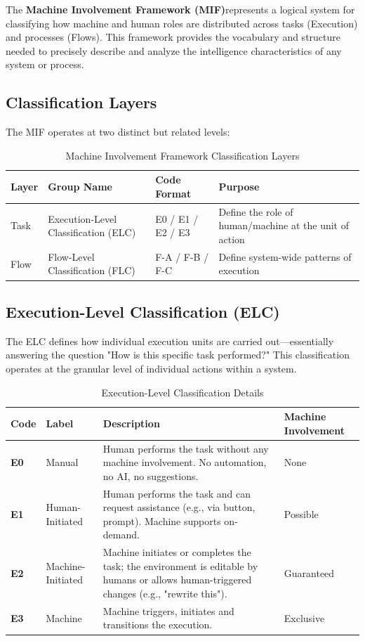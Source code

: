 \documentclass[12pt,a4paper]{article}
\newcommand{\elc}[1]{\textbf{E#1}}
\newcommand{\mif}{\textbf{Machine Involvement Framework (MIF)}}
\begin{document}
The \mif represents a logical system for classifying how machine and human roles are distributed across tasks (Execution) and processes (Flows). This framework provides the vocabulary and structure needed to precisely describe and analyze the intelligence characteristics of any system or process.

\subsection{Classification Layers}

The MIF operates at two distinct but related levels:

\begin{table}[h]
\centering
\caption{Machine Involvement Framework Classification Layers}
\begin{tabular}{|l|l|l|l|}
\hline
\textbf{Layer} & \textbf{Group Name} & \textbf{Code Format} & \textbf{Purpose} \\
\hline
Task & Execution-Level Classification (ELC) & E0 / E1 / E2 / E3 & Define the role of human/machine at the unit of action \\
\hline
Flow & Flow-Level Classification (FLC) & F-A / F-B / F-C & Define system-wide patterns of execution \\
\hline
\end{tabular}
\end{table}

\subsection{Execution-Level Classification (ELC)}

The ELC defines how individual execution units are carried out—essentially answering the question "How is this specific task performed?" This classification operates at the granular level of individual actions within a system.

\begin{table}[h]
\centering
\caption{Execution-Level Classification Details}
\begin{tabular}{|l|l|l|l|}
\hline
\textbf{Code} & \textbf{Label} & \textbf{Description} & \textbf{Machine Involvement} \\
\hline
\elc{0} & Manual & Human performs the task without any machine involvement. No automation, no AI, no suggestions. & None \\
\hline
\elc{1} & Human-Initiated & Human performs the task and can request assistance (e.g., via button, prompt). Machine supports on-demand. & Possible \\
\hline
\elc{2} & Machine-Initiated & Machine initiates or completes the task; the environment is editable by humans or allows human-triggered changes (e.g., "rewrite this"). & Guaranteed \\
\hline
\elc{3} & Machine & Machine triggers, initiates and transitions the execution. & Exclusive \\
\hline
\end{tabular}
\end{table}
\end{document}
